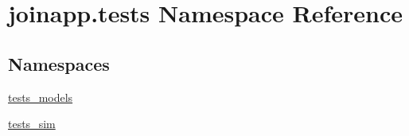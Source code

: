 \hypertarget{namespacejoinapp_1_1tests}{}\section{joinapp.\+tests Namespace Reference}
\label{namespacejoinapp_1_1tests}
\subsection*{Namespaces}
\begin{DoxyCompactItemize}
\item 
 \mbox{\hyperlink{namespacejoinapp_1_1tests_1_1tests__models}{tests\+\_\+models}}
\item 
 \mbox{\hyperlink{namespacejoinapp_1_1tests_1_1tests__sim}{tests\+\_\+sim}}
\end{DoxyCompactItemize}
